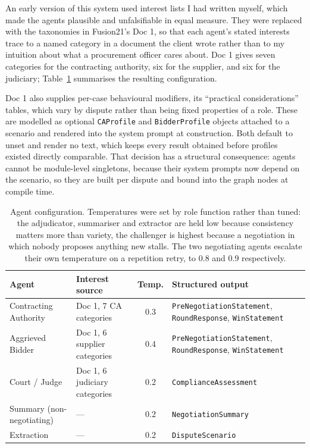 An early version of this system used interest lists I had written myself, which
made the agents plausible and unfalsifiable in equal measure. They were replaced
with the taxonomies in Fusion21's Doc 1, so that each agent's stated interests
trace to a named category in a document the client wrote rather than to my
intuition about what a procurement officer cares about. Doc 1 gives seven
categories for the contracting authority, six for the supplier, and six for the
judiciary; Table~\ref{tab:agent-config} summarises the resulting configuration.

Doc 1 also supplies per-case behavioural modifiers, its ``practical
considerations'' tables, which vary by dispute rather than being fixed properties
of a role. These are modelled as optional \texttt{CAProfile} and
\texttt{BidderProfile} objects attached to a scenario and rendered into the system
prompt at construction. Both default to unset and render no text, which keeps
every result obtained before profiles existed directly comparable. That
decision has a structural consequence: agents cannot be module-level singletons,
because their system prompts now depend on the scenario, so they are built per
dispute and bound into the graph nodes at compile time.

\begin{table}[htbp]
\centering
\footnotesize
\caption[Agent configuration]{Agent configuration. Temperatures were set by role
function rather than tuned: the adjudicator, summariser and extractor are held low
because consistency matters more than variety, the challenger is highest because a
negotiation in which nobody proposes anything new stalls. The two negotiating
agents escalate their own temperature on a repetition retry, to 0.8 and 0.9
respectively.}
\label{tab:agent-config}
\begin{tabular}{@{}llcp{5.4cm}@{}}
\toprule
\textbf{Agent} & \textbf{Interest source} & \textbf{Temp.} & \textbf{Structured output} \\
\midrule
Contracting Authority & Doc 1, 7 CA categories & 0.3 &
  \texttt{PreNegotiationStatement}, \texttt{RoundResponse}, \texttt{WinStatement} \\
Aggrieved Bidder & Doc 1, 6 supplier categories & 0.4 &
  \texttt{PreNegotiationStatement}, \texttt{RoundResponse}, \texttt{WinStatement} \\
Court / Judge & Doc 1, 6 judiciary categories & 0.2 &
  \texttt{ComplianceAssessment} \\
Summary (non-negotiating) & --- & 0.2 &
  \texttt{NegotiationSummary} \\
Extraction & --- & 0.2 &
  \texttt{DisputeScenario} \\
\bottomrule
\end{tabular}
\end{table}

